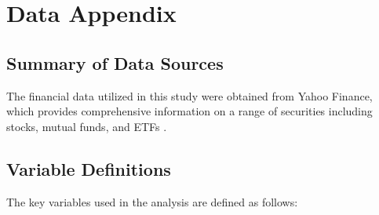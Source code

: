 \appendix
\section{Data Appendix}

\subsection{Summary of Data Sources}
The financial data utilized in this study were obtained from Yahoo Finance, which provides comprehensive information on a range of securities including stocks, mutual funds, and ETFs \citep{yfinance}.

\subsection{Variable Definitions}
The key variables used in the analysis are defined as follows:
